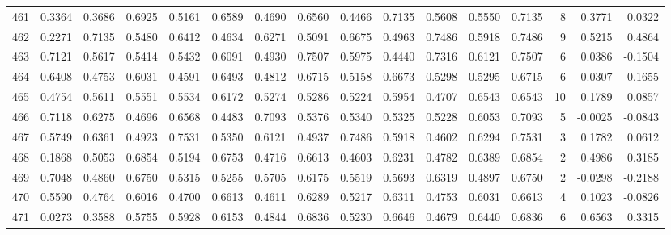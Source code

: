 \begin{tabular}{lrrrrrrrrrrrrrrr}
461 &      0.3364 &  0.3686 &  0.6925 &  0.5161 &  0.6589 &  0.4690 &  0.6560 &  0.4466 &  0.7135 &  0.5608 &   0.5550 &     0.7135 &      8 &                    0.3771 &                     0.0322 \\
462 &      0.2271 &  0.7135 &  0.5480 &  0.6412 &  0.4634 &  0.6271 &  0.5091 &  0.6675 &  0.4963 &  0.7486 &   0.5918 &     0.7486 &      9 &                    0.5215 &                     0.4864 \\
463 &      0.7121 &  0.5617 &  0.5414 &  0.5432 &  0.6091 &  0.4930 &  0.7507 &  0.5975 &  0.4440 &  0.7316 &   0.6121 &     0.7507 &      6 &                    0.0386 &                    -0.1504 \\
464 &      0.6408 &  0.4753 &  0.6031 &  0.4591 &  0.6493 &  0.4812 &  0.6715 &  0.5158 &  0.6673 &  0.5298 &   0.5295 &     0.6715 &      6 &                    0.0307 &                    -0.1655 \\
465 &      0.4754 &  0.5611 &  0.5551 &  0.5534 &  0.6172 &  0.5274 &  0.5286 &  0.5224 &  0.5954 &  0.4707 &   0.6543 &     0.6543 &     10 &                    0.1789 &                     0.0857 \\
466 &      0.7118 &  0.6275 &  0.4696 &  0.6568 &  0.4483 &  0.7093 &  0.5376 &  0.5340 &  0.5325 &  0.5228 &   0.6053 &     0.7093 &      5 &                   -0.0025 &                    -0.0843 \\
467 &      0.5749 &  0.6361 &  0.4923 &  0.7531 &  0.5350 &  0.6121 &  0.4937 &  0.7486 &  0.5918 &  0.4602 &   0.6294 &     0.7531 &      3 &                    0.1782 &                     0.0612 \\
468 &      0.1868 &  0.5053 &  0.6854 &  0.5194 &  0.6753 &  0.4716 &  0.6613 &  0.4603 &  0.6231 &  0.4782 &   0.6389 &     0.6854 &      2 &                    0.4986 &                     0.3185 \\
469 &      0.7048 &  0.4860 &  0.6750 &  0.5315 &  0.5255 &  0.5705 &  0.6175 &  0.5519 &  0.5693 &  0.6319 &   0.4897 &     0.6750 &      2 &                   -0.0298 &                    -0.2188 \\
470 &      0.5590 &  0.4764 &  0.6016 &  0.4700 &  0.6613 &  0.4611 &  0.6289 &  0.5217 &  0.6311 &  0.4753 &   0.6031 &     0.6613 &      4 &                    0.1023 &                    -0.0826 \\
471 &      0.0273 &  0.3588 &  0.5755 &  0.5928 &  0.6153 &  0.4844 &  0.6836 &  0.5230 &  0.6646 &  0.4679 &   0.6440 &     0.6836 &      6 &                    0.6563 &                     0.3315 \\

\end{tabular}
